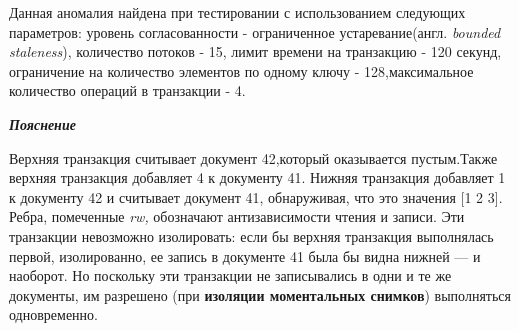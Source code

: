 \documentclass[12pt,  openany]{book}
\begin{document}
\par
Данная аномалия найдена при тестировании с использованием следующих параметров: уровень согласованности - ограниченное устаревание(англ.  \textit{bounded staleness}),  количество потоков - 15, лимит времени на транзакцию - 120 секунд, ограничение на количество элементов по одному ключу - 128,максимальное количество операций в транзакции - 4.
\par
\textit{\textbf{Пояснение}}
\par
Верхняя транзакция считывает документ 42,который оказывается пустым.Также верхняя транзакция добавляет 4 к документу 41. Нижняя транзакция добавляет 1 к документу 42 и считывает документ 41, обнаруживая, что это значения [1 2 3]. Ребра, помеченные \textit{rw,} обозначают антизависимости чтения и записи. Эти транзакции невозможно изолировать: если бы верхняя транзакция выполнялась первой, изолированно, ее запись в документе 41 была бы видна нижней --- и наоборот. Но поскольку эти транзакции не записывались в одни и те же документы, им разрешено (при \textbf{изоляции моментальных снимков}) выполняться одновременно.
\end{document}
